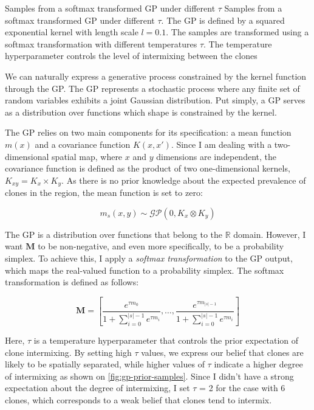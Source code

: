     {Samples from a softmax transformed \acs{GP} under different $\tau$}
    {Samples from a softmax transformed \ac{GP} under different $\tau$. The \ac{GP} is defined by a squared exponential kernel with length scale $l=0.1$. The samples are transformed using a softmax transformation with different temperatures $\tau$. The temperature hyperparameter controls the level of intermixing between the clones}


We can naturally express a generative process constrained by the kernel function through the \acf{GP}. The \ac{GP} represents a stochastic process where any finite set of random variables exhibits a joint Gaussian distribution. Put simply, a \ac{GP} serves as a distribution over functions which shape is constrained by the kernel. 

The \ac{GP} relies on two main components for its specification: a mean function $m(x)$ and a covariance function $K(x,x')$. Since I am dealing with a two-dimensional spatial map, where $x$ and $y$ dimensions are independent, the covariance function is defined as the product of two one-dimensional kernels, $K_{xy} = K_x \times K_y$. As there is no prior knowledge about the expected prevalence of clones in the region, the mean function is set to zero:

\begin{equation}
    m_s(x,y) \sim \mathcal{GP}(0, K_x \otimes K_y)
\end{equation}

The \ac{GP} is a distribution over functions that belong to the $\mathbb{R}$ domain. However, 
I want $\mathbf{M}$ to be non-negative, and even more specifically, to be a probability simplex. To achieve this, I apply a \emph{softmax transformation} to the \ac{GP} output, which maps the real-valued function to a probability simplex. The softmax transformation is defined as follows:

\begin{equation}
    \mathbf{M} = \left[ \dfrac{e^{\tau m_0}}{1 + \sum_{i=0}^{|s|-1}{e^{\tau m_i}}}, \dots, \dfrac{e^{\tau m_{|s|-1}}}{1 + \sum_{i=0}^{|s|-1}{e^{\tau m_i}}} \right]
\end{equation}

Here, $\tau$ is a temperature hyperparameter that controls the prior expectation of clone intermixing. By setting high $\tau$ values, we express our belief that clones are likely to be spatially separated, while higher values of $\tau$ indicate a higher degree of intermixing as shown on \cref{fig:gp-prior-samples}. Since I didn't have a strong expectation about the degree of intermixing, I set $\tau$ = 2 for the case with 6 clones, which corresponds to a weak belief that clones tend to intermix.

